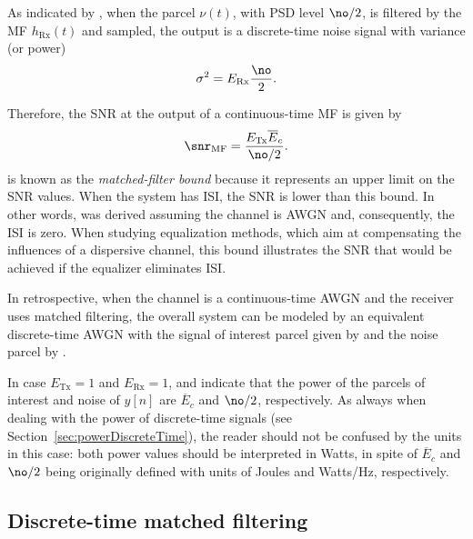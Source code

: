 As indicated by , when the parcel $\nu(t)$, with PSD level $\no/2$, is filtered by the MF $h_\textrm{Rx}(t)$ and sampled, the output is a discrete-time noise signal with variance (or power)
\begin{equation}
\sigma^2 = E_{\textrm{Rx}} \frac{\no}{2}.
\label{eq:mfOutputNoiseParcel}
\end{equation}

Therefore, the SNR at the output of a continuous-time MF is given by 
\begin{equation}
\snr_{\textrm{MF}} = \frac{E_{\textrm{Tx}} \overline E_c}{\no/2}.
\label{eq:matchedFilterSNR}
\end{equation}
 is known as the \emph{matched-filter bound} because it represents an upper limit on the SNR values. When the system has ISI, the SNR is lower than this bound. In other words,  was derived assuming the channel is AWGN and, consequently, the ISI is zero. When studying equalization methods, which aim at compensating the influences of a dispersive channel, this bound illustrates the SNR that would be achieved if the equalizer eliminates ISI.

In retrospective, when the channel is a continuous-time AWGN and the receiver uses matched filtering, the overall system can be modeled by an equivalent discrete-time AWGN with
the signal of interest parcel given by  and the noise
parcel by .

In case $E_{\textrm{Tx}}=1$ and $E_{\textrm{Rx}}=1$, 
 and  indicate that the power of the parcels of interest and noise of $y[n]$ are $\overline E_c$ and $\no/2$, respectively. As always when dealing with the
power of discrete-time signals (see Section~\ref{sec:powerDiscreteTime}), the reader should not be confused by the units in this case: both power values should be interpreted in Watts, in spite of $\overline E_c$ and $\no/2$ being originally defined with units of Joules and Watts/Hz, respectively.

\subsection{Discrete-time matched filtering}

